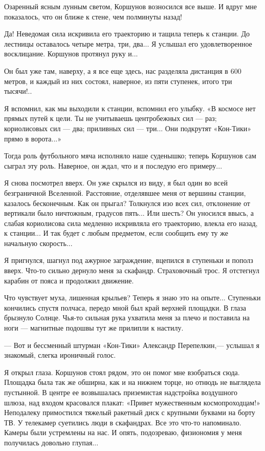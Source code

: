 \documentclass[11pt,a4paper,oneside]{article}
\begin{document}
Озаренный ясным лунным светом, Коршунов возносился все выше. И вдруг мне показалось, что он ближе к стене, чем полминуты назад!

Да! Неведомая сила искривила его траекторию и тащила теперь к станции. До лестницы оставалось четыре метра, три, два... Я услышал его удовлетворенное восклицание. Коршунов протянул руку и...

Он был уже там, наверху, а я все еще здесь, нас разделяла дистанция в 600 метров, и каждый из них состоял, наверное, из пяти ступенек, итого три тысячи!..

Я вспомнил, как мы выходили к станции, вспомнил его улыбку. «В космосе нет прямых путей к цели. Ты не учитываешь центробежных сил — раз; кориолисовых сил — два; приливных сил — три... Они подкрутят «Кон-Тики» прямо в ворота...»

Тогда роль футбольного мяча исполняло наше суденышко; теперь Коршунов сам сыграл эту роль. Наверное, он ждал, что и я последую его примеру...

Я снова посмотрел вверх. Он уже скрылся из виду, я был один во всей безграничной Вселенной. Расстояние, отделявшее меня от вершины станции, казалось бесконечным. Как он прыгал? Толкнулся изо всех сил, отклонение от вертикали было ничтожным, градусов пять... Или шесть? Он уносился ввысь, а слабая кориолисова сила медленно искривляла его траекторию, влекла его назад, к станции... И так будет с любым предметом, если сообщить ему ту же начальную скорость...

Я пригнулся, шагнул под ажурное заграждение, вцепился в ступеньки и пополз вверх. Что-то сильно дернуло меня за скафандр. Страховочный трос. Я отстегнул карабин от пояса и продолжил движение.

Что чувствует муха, лишенная крыльев? Теперь я знаю это на опыте... Ступеньки кончились спустя полчаса, передо мной был край верхней площадки. В глаза брызнуло Солнце. Чья-то сильная рука ухватила меня за плечо и поставила на ноги — магнитные подошвы тут же прилипли к настилу.

— Вот и бессменный штурман «Кон-Тики» Александр Перепелкин,— услышал я знакомый, слегка ироничный голос.

Я открыл глаза. Коршунов стоял рядом, это он помог мне взобраться сюда. Площадка была так же обширна, как и на нижнем торце, но отнюдь не выглядела пустынной. В центре ее возвышалась приземистая надстройка воздушного шлюза, над входом красовался плакат: «Привет мужественным космопроходцам!» Неподалеку примостился тяжелый ракетный диск с крупными буквами на борту ТВ. У телекамер суетились люди в скафандрах. Все это что-то напоминало. Камеры были устремлены на нас. И опять, подозреваю, физиономия у меня получилась довольно глупая...
\end{document}
